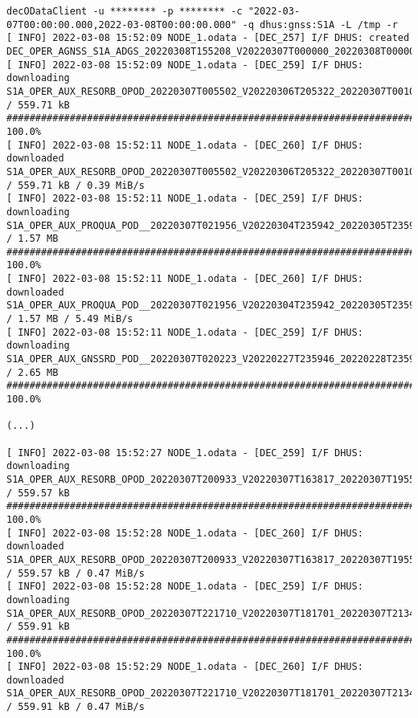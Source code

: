 \documentclass[dec_sum_main.tex]{subfiles}
\begin{document}
\begin{Verbatim}[fontsize=\tiny]
 decODataClient -u ******** -p ******** -c "2022-03-07T00:00:00.000,2022-03-08T00:00:00.000" -q dhus:gnss:S1A -L /tmp -r
[ INFO] 2022-03-08 15:52:09 NODE_1.odata - [DEC_257] I/F DHUS: created DEC_OPER_AGNSS_S1A_ADGS_20220308T155208_V20220307T000000_20220308T000000_18_00.xml
[ INFO] 2022-03-08 15:52:09 NODE_1.odata - [DEC_259] I/F DHUS: downloading S1A_OPER_AUX_RESORB_OPOD_20220307T005502_V20220306T205322_20220307T001052 / 559.71 kB
########################################################################################################################################################################################################## 100.0%
[ INFO] 2022-03-08 15:52:11 NODE_1.odata - [DEC_260] I/F DHUS: downloaded S1A_OPER_AUX_RESORB_OPOD_20220307T005502_V20220306T205322_20220307T001052 / 559.71 kB / 0.39 MiB/s
[ INFO] 2022-03-08 15:52:11 NODE_1.odata - [DEC_259] I/F DHUS: downloading S1A_OPER_AUX_PROQUA_POD__20220307T021956_V20220304T235942_20220305T235941 / 1.57 MB
########################################################################################################################################################################################################## 100.0%
[ INFO] 2022-03-08 15:52:11 NODE_1.odata - [DEC_260] I/F DHUS: downloaded S1A_OPER_AUX_PROQUA_POD__20220307T021956_V20220304T235942_20220305T235941 / 1.57 MB / 5.49 MiB/s
[ INFO] 2022-03-08 15:52:11 NODE_1.odata - [DEC_259] I/F DHUS: downloading S1A_OPER_AUX_GNSSRD_POD__20220307T020223_V20220227T235946_20220228T235936 / 2.65 MB
########################################################################################################################################################################################################## 100.0%

(...)

[ INFO] 2022-03-08 15:52:27 NODE_1.odata - [DEC_259] I/F DHUS: downloading S1A_OPER_AUX_RESORB_OPOD_20220307T200933_V20220307T163817_20220307T195547 / 559.57 kB
########################################################################################################################################################################################################## 100.0%
[ INFO] 2022-03-08 15:52:28 NODE_1.odata - [DEC_260] I/F DHUS: downloaded S1A_OPER_AUX_RESORB_OPOD_20220307T200933_V20220307T163817_20220307T195547 / 559.57 kB / 0.47 MiB/s
[ INFO] 2022-03-08 15:52:28 NODE_1.odata - [DEC_259] I/F DHUS: downloading S1A_OPER_AUX_RESORB_OPOD_20220307T221710_V20220307T181701_20220307T213431 / 559.91 kB
########################################################################################################################################################################################################## 100.0%
[ INFO] 2022-03-08 15:52:29 NODE_1.odata - [DEC_260] I/F DHUS: downloaded S1A_OPER_AUX_RESORB_OPOD_20220307T221710_V20220307T181701_20220307T213431 / 559.91 kB / 0.47 MiB/s
\end{Verbatim}
\end{document}

